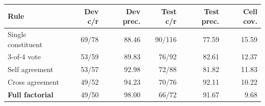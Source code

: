 \begin{tabular}{lrrrrr}
\toprule
Rule & Dev c/r & Dev prec. & Test c/r & Test prec. & Cell cov. \\
\midrule
Single constituent & 69/78 & 88.46 & 90/116 & 77.59 & 15.59 \\
3-of-4 vote & 53/59 & 89.83 & 76/92 & 82.61 & 12.37 \\
Self agreement & 53/57 & 92.98 & 72/88 & 81.82 & 11.83 \\
Cross agreement & 49/52 & 94.23 & 70/76 & 92.11 & 10.22 \\
\textbf{Full factorial} & 49/50 & 98.00 & 66/72 & 91.67 & 9.68 \\
\bottomrule
\end{tabular}
